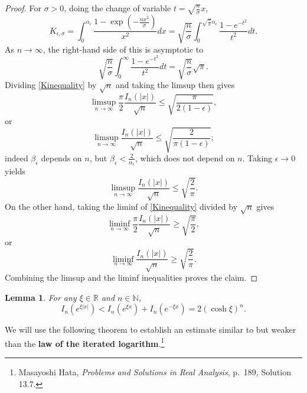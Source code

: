 \documentclass{article}
\newtheorem{lemma}[theorem]{Lemma}
\theoremstyle{definition}
\begin{document}
\begin{proof}
For $\sigma>0$, doing the change of variable $t=\sqrt{\frac{n}{\sigma}} x$,
\[
K_{\epsilon,\sigma} = \int_0^{\alpha_\epsilon} \frac{1-\exp\left(-\frac{nx^2}{\sigma} \right)}{x^2} dx
=\sqrt{\frac{n}{\sigma}} \int_0^{\sqrt{\frac{n}{\sigma}} \alpha_\epsilon} \frac{1-e^{-t^2}}{t^2} dt.
\]
As $n \to \infty$,
the right-hand side of this is asymptotic to
\[
\sqrt{\frac{n}{\sigma}} \int_0^{\infty} \frac{1-e^{-t^2}}{t^2} dt = \sqrt{\frac{n}{\sigma}} \sqrt{\pi}.
\]
Dividing  \eqref{Kinequality} by $\sqrt{n}$ and taking the limsup then gives 
\[
\limsup_{n \to \infty} \frac{\pi}{2} \frac{I_n(|x|)}{\sqrt{n}} \leq \sqrt{\frac{\pi}{2(1-\epsilon)}},
\]
or
\[
\limsup_{n \to \infty} \frac{I_n(|x|)}{\sqrt{n}} \leq \sqrt{\frac{2}{\pi(1-\epsilon)}};
\]
indeed $\beta_\epsilon$ depends on $n$, but $\beta_\epsilon < \frac{2}{\alpha_\epsilon}$, which does not depend on $n$.
Taking $\epsilon \to 0$ yields
\[
\limsup_{n \to \infty} \frac{I_n(|x|)}{\sqrt{n}} \leq \sqrt{\frac{2}{\pi}}.
\]
On the other hand, taking the liminf of \eqref{Kinequality} divided by $\sqrt{n}$ gives
\[
\liminf_{n \to \infty} \frac{\pi}{2} \frac{I_n(|x|)}{\sqrt{n}} \geq \sqrt{\frac{\pi}{2}},
\]
or
\[
\liminf_{n \to \infty}\frac{I_n(|x|)}{\sqrt{n}} \geq \sqrt{\frac{2}{\pi}}.
\]
Combining the limsup and the liminf inequalities proves the claim.
\end{proof}


\begin{lemma}
For any $\xi \in \mathbb{R}$  and $n \in \mathbb{N}$,
\[
I_n(e^{\xi|x|}) <I_n(e^{\xi x})+I_n(e^{-\xi x})= 2 (\cosh \xi)^n.
\]
\label{coshestimate}
\end{lemma}




We will use the following theorem to establish an estimate similar to but weaker than the \textbf{law of the iterated logarithm}.\footnote{Masayoshi Hata, {\em Problems and Solutions in Real Analysis}, p.~189, Solution 13.7.}
\end{document}
